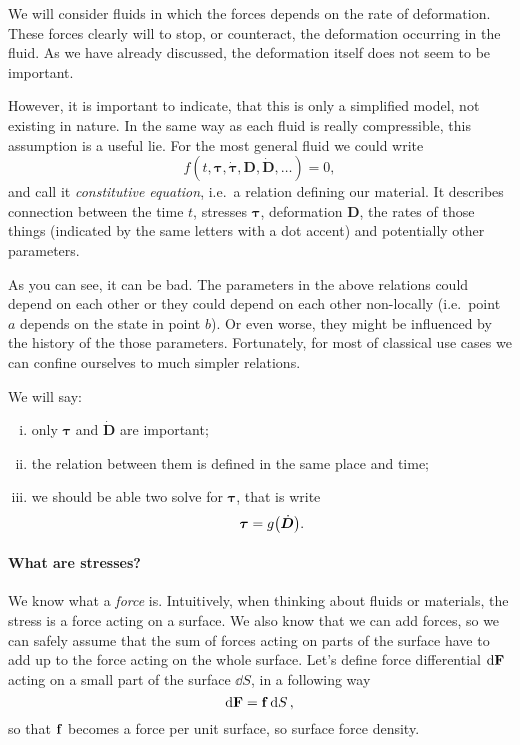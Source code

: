 \documentclass{article}
\begin{document}
We will consider fluids in which the forces depends on the rate of deformation. 
These forces clearly will  to stop, or counteract, the deformation 
occurring in the fluid. As we have already discussed, the deformation itself 
does not seem to be important.

However, it is important to indicate, that this is only a simplified model, 
not existing in nature. In the same way as each fluid is really compressible,
this assumption is a useful lie. For  
the most general fluid we could write
\[
  f(t, \bm{\tau}, \dot{\bm{\tau}}, \bm{D}, \dot{\bm{D}}, \dots) = 0,
\]
and call it \emph{constitutive equation}, i.e.\ a relation defining our material.
It describes connection between the time \(t\), stresses \(\bm{\tau}\), deformation \(\bm{D}\),
the rates of those things (indicated by the same letters with a dot accent) 
and potentially other parameters.

As you can see, it can be bad. The parameters in the above relations could
depend on each other or they could depend on each other non-locally (i.e.\ point
\(a\) depends on the state in point \(b\)). Or even worse, they might be influenced
by the history of the those parameters. Fortunately, for most of classical use 
cases we can confine ourselves to much simpler relations.

We will say:
\begin{enumerate}[(i)]
  \item only \(\bm{\tau}\) and \(\dot{\bm{D}}\) are important;
  \item the relation between them is defined in the same place and time;
  \item we should be able two solve for \(\bm{\tau}\), that is write
    \[
      \bm{\tau} = g\qty(\dot{\bm{D}}).
    \]
\end{enumerate}

\paragraph{What are stresses?}
We know what a \emph{force} is. Intuitively,
when thinking about fluids or materials, the stress is a force acting on 
a surface. We also know that we can add forces, so we can safely assume that
the sum of forces acting on parts of the surface have to add up to the force 
acting on the whole surface. Let's define force differential \(\dd{\vb{F}}\) acting 
on a small part of the surface \(\dd S\), in a following way
\[
  \dd \vb{F} = \vb{f}\dd{S},
\]
so that \(\vb{f}\) becomes a force per unit surface, so surface force density.
\end{document}
